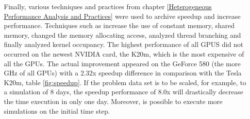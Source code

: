   \vspace{4.0em}

Finally, various techniques and practices from chapter \ref{Heterogeneous Performance Analysis and Practices} were used to archive speedup and increase performance. Techniques such as increase the use of constant memory, shared memory, changed the memory allocating access, analyzed thread branching and finally analyzed kernel occupancy. The highest performance of all GPUS did not occurred on the newest NVIDIA card, the K20m, which is the most expensive of all the GPUs. The actual improvement appeared on the GeForce 580 (the more GHz of all GPUs) with a 2.32x speedup difference in comparison with the Tesla K20m, table  \ref{fig:speedup}. If the problem data set is to be scaled, for example, to a simulation of 8 days, the speedup performance of 8.0x will drastically decrease the time execution in only one day. Moreover, is possible to execute more simulations on the initial time step.
  
